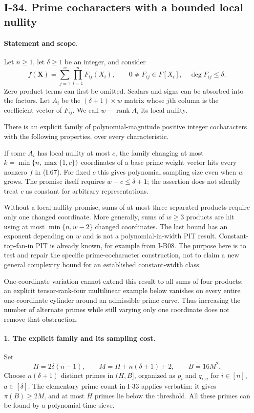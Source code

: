 \subsection{I-34. Prime cocharacters with a bounded local nullity}
\label{I-34}

\paragraph{Statement and scope.}
Let $n\ge1$, let $\delta\ge1$ be an integer, and consider
\[
 f(\mathbf X)=\sum_{j=1}^{w}\prod_{i=1}^{n}F_{ij}(X_i),
 \qquad 0\ne F_{ij}\in F[X_i],\quad \deg F_{ij}\le\delta.
 \tag{I.67}
\]
Zero product terms can first be omitted. Scalars and signs can be
absorbed into the factors. Let $A_i$ be the $(\delta+1)\times w$
matrix whose $j$th column is the coefficient vector of $F_{ij}$.
We call $w-\operatorname{rank}A_i$ its local nullity.

There is an explicit family of polynomial-magnitude positive
integer cocharacters with the following properties, over every
characteristic.

If some $A_i$ has local nullity at most $c$, the family changing
at most $k=\min\{n,\max\{1,c\}\}$ coordinates of a base prime
weight vector hits every nonzero $f$ in (I.67). For fixed $c$
this gives polynomial sampling size even when $w$ grows. The
promise itself requires $w-c\le\delta+1$; the assertion does not
silently treat $c$ as constant for arbitrary representations.

Without a local-nullity promise, sums of at most three separated
products require only one changed coordinate. More generally,
sums of $w\ge3$ products are hit using at most
$\min\{n,w-2\}$ changed coordinates. The last bound has an
exponent depending on $w$ and is not a polynomial-in-width PIT
result. Constant-top-fan-in PIT is already known, for example
from I-B08. The purpose here is to test and repair the specific
prime-cocharacter construction, not to claim a new general
complexity bound for an established constant-width class.

One-coordinate variation cannot extend this result to all sums
of four products: an explicit tensor-rank-four multilinear
example below vanishes on every entire one-coordinate cylinder
around an admissible prime curve. Thus increasing the number of
alternate primes while still varying only one coordinate does
not remove that obstruction.

\paragraph{1. The explicit family and its sampling cost.}
Set
\[
 H=2\delta(n-1),\qquad
 M=H+n(\delta+1)+2,\qquad B=16M^2.
\]
Choose $n(\delta+1)$ distinct primes in $(H,B]$, organized as
$p_i$ and $q_{i,a}$ for $i\in[n]$, $a\in[\delta]$.
The elementary prime count in I-33 applies verbatim: it gives
$\pi(B)\ge2M$, and at most $H$ primes lie below the threshold.
All these primes can be found by a polynomial-time sieve.

